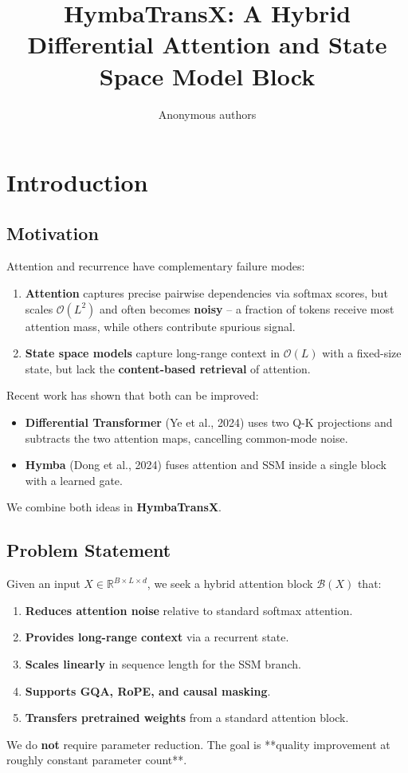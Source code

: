 \title{\textbf{HymbaTransX: A Hybrid Differential Attention and State Space Model Block}}

\author{Anonymous authors}


\section{Introduction}

\subsection{Motivation}

Attention and recurrence have complementary failure modes:

\begin{enumerate}
\item \textbf{Attention} captures precise pairwise dependencies via softmax scores,
  but scales $\mathcal{O}(L^2)$ and often becomes \textbf{noisy} -- a fraction
  of tokens receive most attention mass, while others contribute spurious
  signal.
\item \textbf{State space models} capture long-range context in $\mathcal{O}(L)$
  with a fixed-size state, but lack the \textbf{content-based retrieval} of
  attention.

\end{enumerate}
Recent work has shown that both can be improved:

\begin{itemize}
\item \textbf{Differential Transformer} (Ye et al., 2024) uses two Q-K projections and
  subtracts the two attention maps, cancelling common-mode noise.
\item \textbf{Hymba} (Dong et al., 2024) fuses attention and SSM inside a single block
  with a learned gate.

\end{itemize}
We combine both ideas in \textbf{HymbaTransX}.

\subsection{Problem Statement}

Given an input $X \in \mathbb{R}^{B \times L \times d}$, we seek a hybrid 
attention block $\mathcal{B}(X)$ that:

\begin{enumerate}
\item \textbf{Reduces attention noise} relative to standard softmax attention.
\item \textbf{Provides long-range context} via a recurrent state.
\item \textbf{Scales linearly} in sequence length for the SSM branch.
\item \textbf{Supports GQA, RoPE, and causal masking}.
\item \textbf{Transfers pretrained weights} from a standard attention block.

\end{enumerate}
We do \textbf{not} require parameter reduction. The goal is **quality improvement 
at roughly constant parameter count**.

